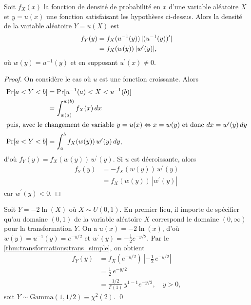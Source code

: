 \begin{thm}
  \label{thm:transformations:trans_simple}
  Soit $f_X(x)$ la fonction de densité de probabilité en $x$ d'une
  variable aléatoire $X$ et $y = u(x)$ une fonction satisfaisant les
  hypothèses ci-dessus. Alors la densité de la variable aléatoire $Y =
  u(X)$ est
  \begin{align*}
    f_Y(y)
    &= f_X(u^{-1}(y))\, \lvert (u^{-1}(y))^\prime \rvert \\
    &= f_X(w(y))\, \lvert w^\prime(y) \rvert,
  \end{align*}
  où $w(y) = u^{-1}(y)$ et en supposant $u^\prime(x) \neq 0$.
\end{thm}
\begin{proof}
  On considère le cas où $u$ est une fonction croissante. Alors
  \begin{align*}
    \operatorname{Pr} [ a < Y < b ]
    &= \operatorname{Pr} [ u^{-1}(a) < X < u^{-1}(b) ] \\
    &= \int_{w(a)}^{w(b)} f_X(x)\, dx \\
    \intertext{puis, avec le changement de variable $y = u(x)
      \Leftrightarrow x = w(y)$ et donc $dx = w^\prime(y)\, dy$}
    \operatorname{Pr} [ a < Y < b ]
    &= \int_a^b f_X(w(y))\, w^\prime(y)\, dy,
  \end{align*}
  d'où $f_Y(y) = f_X(w(y))\, w^\prime(y)$. Si $u$ est décroissante,
  alors
  \begin{align*}
    f_Y(y)
    &= - f_X(w(y))\, w^\prime(y) \\
    &= f_X(w(y))\, |w^\prime(y)|
  \end{align*}
  car $w^\prime(y) < 0$.
\end{proof}

\begin{exemple}
  Soit $Y = -2 \ln(X)$ où $X \sim U(0, 1)$. En premier
  lieu, il importe de spécifier qu'au domaine $(0, 1)$ de la variable
  aléatoire $X$ correspond le domaine $(0, \infty)$ pour la
  transformation $Y$. On a $u(x) = -2 \ln(x)$, d'où $w(y) = u^{-1}(y)
  = e^{-y/2}$ et $w^\prime(y) = -\frac{1}{2} e^{-y/2}$. Par le
  \autoref{thm:transformations:trans_simple}, on obtient
  \begin{align*}
    f_Y(y)
    &= f_X(e^{-y/2})\,
    \left|
      - \frac{1}{2}\, e^{-y/2}
    \right| \\
    &= \frac{1}{2}\, e^{-y/2} \\
    &= \frac{1/2}{\Gamma(1)}\, y^{1 - 1} e^{-y/2}, \quad y > 0,
  \end{align*}
  soit $Y \sim \text{Gamma}(1, 1/2) \equiv \chi^2(2)$.
  \qed
\end{exemple}

